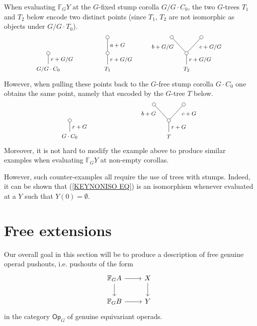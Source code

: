 \documentclass[a4paper,10pt]{article}%
\begin{document}
\begin{remark}
  When evaluating $\mathbb{F}_G Y$ at the $G$-fixed stump corolla $G/G \cdot C_0$, the two $G$-trees $T_1$ and $T_2$ below encode two distinct points (since $T_1$, $T_2$ are not isomorphic as objects under $G/G\cdot T_0$).
  \[
  \begin{tikzpicture}[grow=up,auto,level distance=2.3em,every node/.style = {font=\footnotesize},dummy/.style={circle,draw,inner sep=0pt,minimum size=1.75mm}]
    \node at (0,0) {$G/G \cdot C_0$}
    child{
      node [dummy] {}
      edge from parent node [swap] {$r+G/G$}};
    \node at (3,0) {$T_1$}
    child{node [dummy] {}
      child{node [dummy] {}
        edge from parent node [swap] {$a+G$}}
      edge from parent node [swap] {$r+G/G$}};
    \node at (7,0) {$T_2$}
    child{node [dummy] {}
      child{node [dummy] {}
        edge from parent node [swap,near end] {$c+G/G$}}
      child{node [dummy] {}
        edge from parent node [near end] {$b+G/G$}}
      edge from parent node [swap] {$r+G/G$}};
  \end{tikzpicture}
  \]
  However, when pulling these points back to the $G$-free stump corolla $G \cdot C_0$ one obtains the same point, namely that encoded by the $G$-tree $T$ below.
  \[
  \begin{tikzpicture}[grow=up,auto,level distance=2.3em,every node/.style = {font=\footnotesize},dummy/.style={circle,draw,inner sep=0pt,minimum size=1.75mm}]
    \node at (0,0) {$G \cdot C_0$}
    child{
      node [dummy] {}
      edge from parent node [swap] {$r+G$}};
    \node at (5,0) {$T$}
    child{node [dummy] {}
      child{node [dummy] {}
        edge from parent node [swap,near end] {$c+G$}}
      child{node [dummy] {}
        edge from parent node [near end] {$b+G$}}
      edge from parent node [swap] {$r+G$}};
  \end{tikzpicture}
  \]
  Moreover, it is not hard to modify the example above to produce similar examples when evaluating $\mathbb{F}_GY$ at non-empty corollas. 

  However, such counter-examples all require the use of trees with stumps. Indeed, it can be shown that (\ref{KEYNONISO EQ})
  is an isomorphism whenever evaluated at a $Y$ such that $Y(0)=\emptyset$.
\end{remark}



\section{Free extensions}

Our overall goal in this section will be to produce a description of free genuine operad pushouts, i.e. pushouts of the form
\[
\begin{tikzcd}
  \mathbb{F}_G A \ar{r} \ar{d} & X \ar{d}
  \\
  \mathbb{F}_G B \ar{r} & Y
\end{tikzcd}
\]
in the category $\mathsf{Op}_G$ of genuine equivariant operads.
\end{document}

